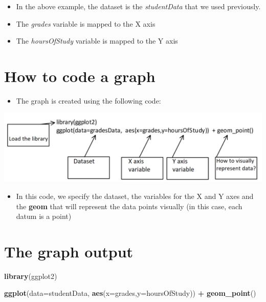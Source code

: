 \documentclass[
]{book}
\newenvironment{Shaded}{\begin{snugshade}}{\end{snugshade}}
\newcommand{\DataTypeTok}[1]{\textcolor[rgb]{0.13,0.29,0.53}{#1}}
\newcommand{\KeywordTok}[1]{\textcolor[rgb]{0.13,0.29,0.53}{\textbf{#1}}}
\newcommand{\NormalTok}[1]{#1}
\newcommand{\OperatorTok}[1]{\textcolor[rgb]{0.81,0.36,0.00}{\textbf{#1}}}
\newcommand{\StringTok}[1]{\textcolor[rgb]{0.31,0.60,0.02}{#1}}
\providecommand{\tightlist}{%
  \setlength{\itemsep}{0pt}\setlength{\parskip}{0pt}}
\begin{document}
\begin{itemize}
\tightlist
\item
  In the above example, the dataset is the \emph{studentData} that we used previously.
\item
  The \emph{grades} variable is mapped to the X axis
\item
  The \emph{hoursOfStudy} variable is mapped to the Y axis
\end{itemize}

\hypertarget{how-to-code-a-graph}{%
\section{How to code a graph}\label{how-to-code-a-graph}}

\begin{itemize}
\tightlist
\item
  The graph is created using the following code:
\end{itemize}

\includegraphics[width=1\linewidth]{img/ggplot2}

\begin{itemize}
\tightlist
\item
  In this code, we specify the dataset, the variables for the X and Y axes and the \textbf{geom} that will represent the data points visually (in this case, each datum is a point)
\end{itemize}

\hypertarget{the-graph-output}{%
\section{The graph output}\label{the-graph-output}}

\begin{Shaded}
\begin{Highlighting}[]
\KeywordTok{library}\NormalTok{(ggplot2)}

\KeywordTok{ggplot}\NormalTok{(}\DataTypeTok{data=}\NormalTok{studentData, }\KeywordTok{aes}\NormalTok{(}\DataTypeTok{x=}\NormalTok{grades,}\DataTypeTok{y=}\NormalTok{hoursOfStudy)) }\OperatorTok{+}\StringTok{ }\KeywordTok{geom_point}\NormalTok{()}
\end{Highlighting}
\end{Shaded}
\end{document}
